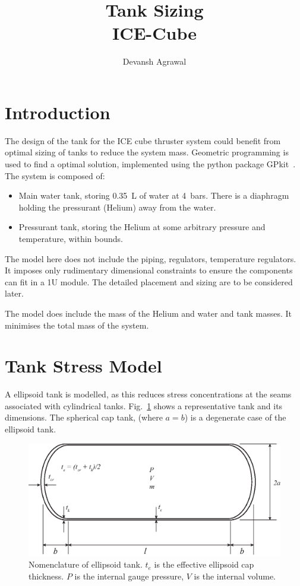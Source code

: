 \documentclass[12pt]{article}
\title{Tank Sizing \\ ICE-Cube}
\author{Devansh Agrawal}
\begin{document}
\maketitle


\section{Introduction}

The design of the tank for the ICE cube thruster system could benefit from optimal sizing of tanks to reduce the system mass. Geometric programming is used to find a optimal solution, implemented using the python package GPkit~\cite{gpkit}. The system is composed of:
\begin{itemize}
\item Main water tank, storing 0.35~L of water at 4~bars. There is a diaphragm holding the pressurant (Helium) away from the water.
\item Pressurant tank, storing the Helium at some arbitrary pressure and temperature, within bounds. 
\end{itemize}

The model here does not include the piping, regulators, temperature regulators. It imposes only rudimentary dimensional constraints to ensure the components can fit in a 1U module. The detailed placement and sizing are to be considered later.

The model does include the mass of the Helium and water and tank masses. It minimises the total mass of the system. 

\section{Tank Stress Model}

A ellipsoid tank is modelled, as this reduces stress concentrations at the seams associated with cylindrical tanks. Fig.~\ref{fig:diagram} shows a representative tank and its dimensions. The spherical cap tank, (where $a = b$) is a degenerate case of the ellipsoid tank. 

\begin{figure}[htbp]
   \centering
   \includegraphics[width=0.7\linewidth]{diagram.eps}
   \caption{Nomenclature of ellipsoid tank. $t_e$ is the effective ellipsoid cap thickness. $P$ is the internal gauge pressure, $V$ is the internal volume.}
   \label{fig:diagram}
\end{figure}
\end{document}
